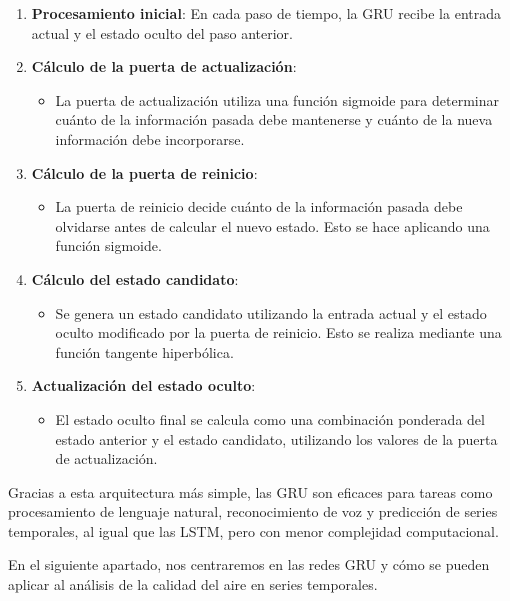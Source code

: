 \documentclass[11pt]{article}
\begin{document}
\begin{enumerate}
\item \textbf{\textbf{Procesamiento inicial}}: En cada paso de tiempo, la GRU recibe la entrada actual y el estado oculto del paso anterior.

\item \textbf{\textbf{Cálculo de la puerta de actualización}}:
\begin{itemize}
\item La puerta de actualización utiliza una función sigmoide para determinar cuánto de la información pasada debe mantenerse y cuánto de la nueva información debe incorporarse.
\end{itemize}

\item \textbf{\textbf{Cálculo de la puerta de reinicio}}:
\begin{itemize}
\item La puerta de reinicio decide cuánto de la información pasada debe olvidarse antes de calcular el nuevo estado. Esto se hace aplicando una función sigmoide.
\end{itemize}

\item \textbf{\textbf{Cálculo del estado candidato}}:
\begin{itemize}
\item Se genera un estado candidato utilizando la entrada actual y el estado oculto modificado por la puerta de reinicio. Esto se realiza mediante una función tangente hiperbólica.
\end{itemize}

\item \textbf{\textbf{Actualización del estado oculto}}:
\begin{itemize}
\item El estado oculto final se calcula como una combinación ponderada del estado anterior y el estado candidato, utilizando los valores de la puerta de actualización.
\end{itemize}
\end{enumerate}

Gracias a esta arquitectura más simple, las GRU son eficaces para tareas como procesamiento de lenguaje natural, reconocimiento de voz y predicción de series temporales, al igual que las LSTM, pero con menor complejidad computacional.

En el siguiente apartado, nos centraremos en las redes GRU y cómo se pueden aplicar al análisis de la calidad del aire en series temporales.
\end{document}
